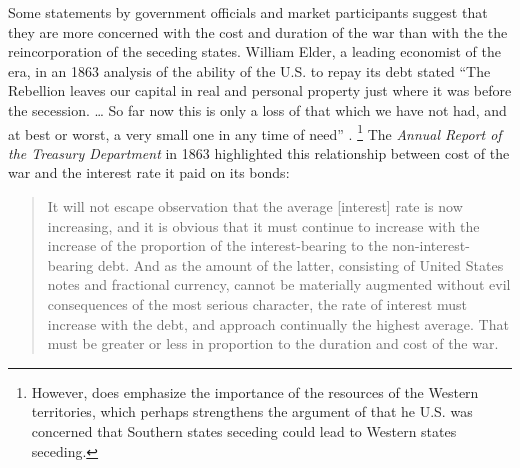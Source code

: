 Some statements by government officials and market participants suggest that they are more concerned with the cost and duration of the war than with the the reincorporation of the seceding states.
William Elder, a leading economist of the era, in an 1863 analysis of the ability of the U.S. to repay its debt stated ``The Rebellion leaves our capital in real and personal property just where it was before the secession. \dots{} So far now this is only a loss of that which we have not had, and at best or worst, a very small one in any time of need'' \parencite[19]{Elder1863}.%
\footnote{
  However, \textcite{Elder1863} does emphasize the importance of the resources of the Western territories, which perhaps strengthens the argument of  \textcite{Weingast1998} that he U.S. was concerned that Southern states seceding could lead to Western states seceding.
}
The \textit{Annual Report of the Treasury Department} in 1863 highlighted this relationship between cost of the war and the interest rate it paid on its bonds:
\begin{quote}
It will not escape observation that the average [interest] rate is now increasing, and it is obvious that it must continue to increase with the increase of the proportion of the interest-bearing to the non-interest-bearing debt. 
And as the amount of the latter, consisting of United States notes and fractional currency, cannot be materially augmented without evil consequences of the most serious character, the rate of interest must increase with the debt, and approach continually the highest average.
That must be greater or less in proportion to the duration and cost of the war. \parencite[13]{Treasury1863}
\end{quote}

